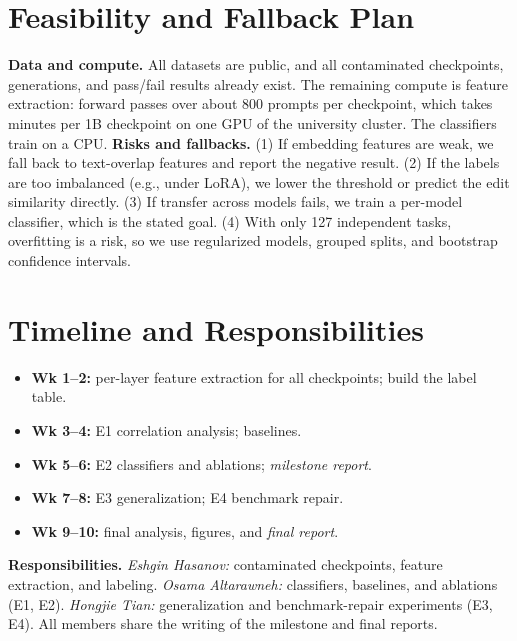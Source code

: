 \documentclass[10pt,twocolumn,letterpaper]{article}
\newcommand{\tightlist}{\setlength\itemsep{0pt}\setlength\parsep{0pt}\setlength\topsep{0pt}}
\begin{document}
\section{Feasibility and Fallback Plan}

\textbf{Data and compute.} All datasets are public, and all contaminated checkpoints, generations, and pass/fail results already exist. The remaining compute is feature extraction: forward passes over about 800 prompts per checkpoint, which takes minutes per 1B checkpoint on one GPU of the university cluster. The classifiers train on a CPU.
\textbf{Risks and fallbacks.}
(1) If embedding features are weak, we fall back to text-overlap features and report the negative result.
(2) If the labels are too imbalanced (e.g., under LoRA), we lower the threshold or predict the edit similarity directly.
(3) If transfer across models fails, we train a per-model classifier, which is the stated goal.
(4) With only 127 independent tasks, overfitting is a risk, so we use regularized models, grouped splits, and bootstrap confidence intervals.

\section{Timeline and Responsibilities}

\begin{itemize}\tightlist
\item \textbf{Wk 1--2:} per-layer feature extraction for all checkpoints; build the label table.
\item \textbf{Wk 3--4:} E1 correlation analysis; baselines.
\item \textbf{Wk 5--6:} E2 classifiers and ablations; \emph{milestone report}.
\item \textbf{Wk 7--8:} E3 generalization; E4 benchmark repair.
\item \textbf{Wk 9--10:} final analysis, figures, and \emph{final report}.
\end{itemize}
\textbf{Responsibilities.} \emph{Eshgin Hasanov:} contaminated checkpoints, feature extraction, and labeling. \emph{Osama Altarawneh:} classifiers, baselines, and ablations (E1, E2). \emph{Hongjie Tian:} generalization and benchmark-repair experiments (E3, E4). All members share the writing of the milestone and final reports.

{\small


}
\end{document}
